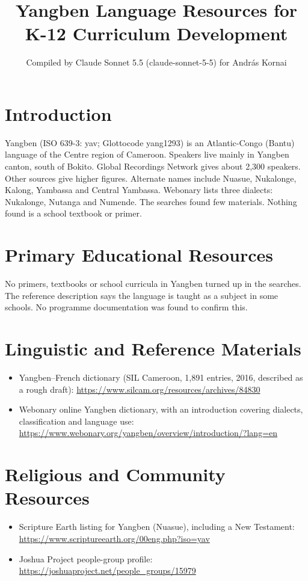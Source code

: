 \documentclass[12pt]{article}
\title{Yangben Language Resources for K-12 Curriculum Development}
\author{Compiled by Claude Sonnet 5.5 (claude-sonnet-5-5) for Andr\'as Kornai}
\date{}
\begin{document}
\maketitle

\section{Introduction}
Yangben (ISO 639-3: yav; Glottocode yang1293) is an Atlantic-Congo (Bantu) language of the Centre region of Cameroon. Speakers live mainly in Yangben canton, south of Bokito. Global Recordings Network gives about 2,300 speakers. Other sources give higher figures. Alternate names include Nuasue, Nukalonge, Kalong, Yambassa and Central Yambassa. Webonary lists three dialects: Nukalonge, Nutanga and Numende. The searches found few materials. Nothing found is a school textbook or primer.

\section{Primary Educational Resources}
No primers, textbooks or school curricula in Yangben turned up in the searches. The reference description says the language is taught as a subject in some schools. No programme documentation was found to confirm this.

\section{Linguistic and Reference Materials}
\begin{itemize}
\item Yangben--French dictionary (SIL Cameroon, 1,891 entries, 2016, described as a rough draft): \url{https://www.silcam.org/resources/archives/84830}
\item Webonary online Yangben dictionary, with an introduction covering dialects, classification and language use: \url{https://www.webonary.org/yangben/overview/introduction/?lang=en}
\end{itemize}

\section{Religious and Community Resources}
\begin{itemize}
\item Scripture Earth listing for Yangben (Nuasue), including a New Testament: \url{https://www.scriptureearth.org/00eng.php?iso=yav}
\item Joshua Project people-group profile: \url{https://joshuaproject.net/people_groups/15979}
\end{itemize}
\end{document}
